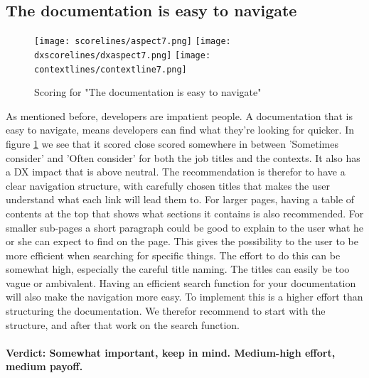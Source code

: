 \documentclass{cslthse-msc}
\begin{document}
    \subsection{The documentation is easy to navigate}
    \begin{figure}[H]
        \centering
        \texttt{[image: scorelines/aspect7.png]}
        \texttt{[image: dxscorelines/dxaspect7.png]}
        \texttt{[image: contextlines/contextline7.png]}
        \caption{Scoring for "The documentation is easy to navigate"}
        \label{fig:aspect7}
    \end{figure}
    As mentioned before, developers are impatient people. A documentation that is easy to navigate, means developers can find what they're looking for quicker. In figure \ref{fig:aspect7} we see that it scored close scored somewhere in between 'Sometimes consider' and 'Often consider' for both the job titles and the contexts. It also has a DX impact that is above neutral. The recommendation is therefor to have a clear navigation structure, with carefully chosen titles that makes the user understand what each link will lead them to. For larger pages, having a table of contents at the top that shows what sections it contains is also recommended. For smaller sub-pages a short paragraph could be good to explain to the user what he or she can expect to find on the page. This gives the possibility to the user to be more efficient when searching for specific things. The effort to do this can be somewhat high, especially the careful title naming. The titles can easily be too vague or ambivalent. Having an efficient search function for your documentation will also make the navigation more easy. To implement this is a higher effort than structuring the documentation. We therefor recommend to start with the structure, and after that work on the search function. \\ \\
    \textbf{Verdict: Somewhat important, keep in mind. Medium-high effort, medium payoff.}
\end{document}
